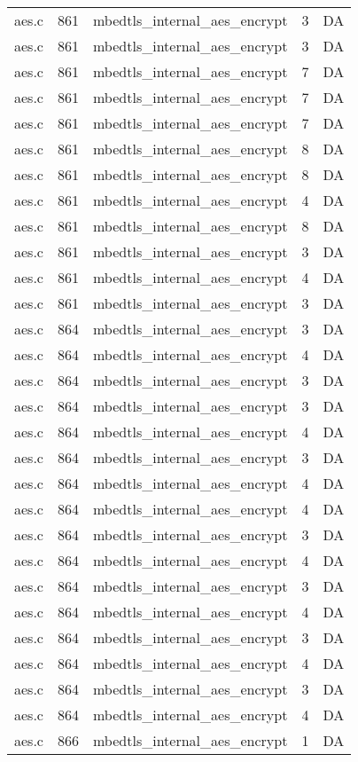 \begin{table*}
\begin{tabular}{clrrr}
aes.c&861&mbedtls\_internal\_aes\_encrypt&3 &DA\\
aes.c&861&mbedtls\_internal\_aes\_encrypt&3 &DA\\
aes.c&861&mbedtls\_internal\_aes\_encrypt&7 &DA\\
aes.c&861&mbedtls\_internal\_aes\_encrypt&7 &DA\\
aes.c&861&mbedtls\_internal\_aes\_encrypt&7 &DA\\
aes.c&861&mbedtls\_internal\_aes\_encrypt&8 &DA\\
aes.c&861&mbedtls\_internal\_aes\_encrypt&8 &DA\\
aes.c&861&mbedtls\_internal\_aes\_encrypt&4 &DA\\
aes.c&861&mbedtls\_internal\_aes\_encrypt&8 &DA\\
aes.c&861&mbedtls\_internal\_aes\_encrypt&3 &DA\\
aes.c&861&mbedtls\_internal\_aes\_encrypt&4 &DA\\
aes.c&861&mbedtls\_internal\_aes\_encrypt&3 &DA\\
aes.c&864&mbedtls\_internal\_aes\_encrypt&3 &DA\\
aes.c&864&mbedtls\_internal\_aes\_encrypt&4 &DA\\
aes.c&864&mbedtls\_internal\_aes\_encrypt&3 &DA\\
aes.c&864&mbedtls\_internal\_aes\_encrypt&3 &DA\\
aes.c&864&mbedtls\_internal\_aes\_encrypt&4 &DA\\
aes.c&864&mbedtls\_internal\_aes\_encrypt&3 &DA\\
aes.c&864&mbedtls\_internal\_aes\_encrypt&4 &DA\\
aes.c&864&mbedtls\_internal\_aes\_encrypt&4 &DA\\
aes.c&864&mbedtls\_internal\_aes\_encrypt&3 &DA\\
aes.c&864&mbedtls\_internal\_aes\_encrypt&4 &DA\\
aes.c&864&mbedtls\_internal\_aes\_encrypt&3 &DA\\
aes.c&864&mbedtls\_internal\_aes\_encrypt&4 &DA\\
aes.c&864&mbedtls\_internal\_aes\_encrypt&3 &DA\\
aes.c&864&mbedtls\_internal\_aes\_encrypt&4 &DA\\
aes.c&864&mbedtls\_internal\_aes\_encrypt&3 &DA\\
aes.c&864&mbedtls\_internal\_aes\_encrypt&4 &DA\\
aes.c&866&mbedtls\_internal\_aes\_encrypt&1 &DA\\

\end{tabular}
\end{table*}
